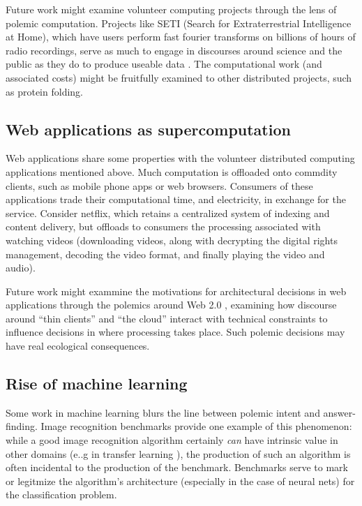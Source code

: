\documentclass[sigconf]{acmart}
\begin{document}
Future work might examine volunteer computing projects through the lens of polemic computation.
Projects like SETI (Search for Extraterrestrial Intelligence at Home), which have users perform fast fourier transforms on billions of hours of radio recordings,
serve as much to engage in discourses around science and the public as they do to produce useable data 
\cite{Anderson2004}.
The computational work (and associated costs) might be fruitfully examined to other distributed projects, 
such as protein folding.

\subsection{Web applications as supercomputation}
\label{sec:org561df5c}

Web applications share some properties with the volunteer distributed computing applications mentioned above.
Much computation is offloaded onto commdity clients, such as mobile phone apps or web browsers.
Consumers of these applications trade their computational time, and electricity, in exchange for the service.
Consider netflix, which retains a centralized system of indexing and content delivery,
but offloads to consumers the processing associated with watching videos 
(downloading videos, along with decrypting the digital rights management, decoding the video format, and finally playing the video and audio).

Future work might exammine the motivations for architectural decisions in web applications through 
the polemics around Web 2.0 
\cite{Scholz2008},
examining how discourse around ``thin clients'' and ``the cloud''
interact with technical constraints
to influence decisions in where processing takes place.
Such polemic decisions may have real ecological consequences.


\subsection{Rise of machine learning}
\label{sec:orgd6e776f}

Some work in machine learning blurs the line 
between polemic intent and answer-finding.
Image recognition benchmarks provide one example of this phenomenon:
while a good image recognition algorithm certainly \emph{can} have intrinsic value in other domains 
(e..g in transfer learning \cite{Jean2016c}),
the production of such an algorithm is often incidental to the production of the benchmark.
Benchmarks serve to mark or legitmize the algorithm's architecture (especially in the case of neural nets)
for the classification problem.
\end{document}
